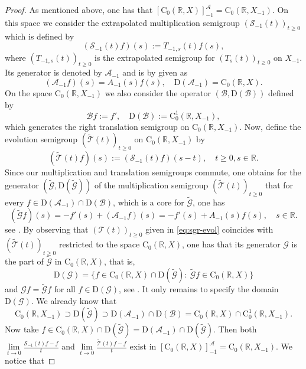 \documentclass[a4paper,oneside,10pt]{amsart}
\theoremstyle{definition}
\numberwithin{equation}{section}
\def\dom{\mathrm{D}}
\def\RR{\mathbb{R}}
\begin{document}
{
\begin{proof}
As mentioned above, one has that $\left[\mathrm{C}_0(\RR,X)\right]_{-1}^{\mathcal{A}}=\mathrm{C}_0(\RR,X_{-1})$. On this space we consider the extrapolated multiplication semigroup $(\mathcal{S}_{-1}(t))_{t\geq0}$ which is defined by
\[
(\mathcal{S}_{-1}(t)f)(s):=T_{-1,s}(t)f(s),
\]
where $(T_{-1,s}(t))_{t\geq0}$ is the extrapolated semigroup for  $(T_s(t))_{t\geq0}$  on  $X_{-1}$.
Its generator is  denoted by $\mathcal{A}_{-1}$ and is by  \cite[Lem.~4.6]{G1997} given as
\[\left(\mathcal{A}_{-1}f\right)(s)= A_{-1}(s)f(s),\quad \dom(\mathcal{A}_{-1}) = \mathrm{C}_0(\RR,X).\]
On the space $\mathrm{C}_0(\RR,X_{-1})$ we also consider the operator $(\mathcal{B},\dom(\mathcal{B}))$ defined by
\[
\mathcal{B}f:=f',\quad \dom(\mathcal{B}):=\mathrm{C}^1_0(\RR,X_{-1}),
\]
which  generates the right translation semigroup on $\mathrm{C}_0(\RR,X_{-1})$. Now, define the {evolution} semigroup $(\widetilde{\mathcal{T}}(t))_{t\geq0}$ on $\mathrm{C}_0(\RR,X_{-1})$ by
\[
(\widetilde{\mathcal{T}}(t)f)(s):={\left(\mathcal{S}_{-1}(t)f\right)}(s-t),\quad t\ge 0, s\in \RR.
\]
{Since our multiplication and translation semigroups commute,}
one obtains for the generator $(\widetilde{\mathcal{G}},\dom(\widetilde{\mathcal{G}}))$ {of the multiplication semigroup  $(\widetilde{\mathcal{T}}(t))_{t\geq0}$} that for every $f\in\dom(\mathcal{A}_{-1})\cap\dom(\mathcal{B})${, which is a core for $\widetilde{\mathcal{G}}$,} one has 
\[
(\widetilde{\mathcal{G}}f)(s)=-f'(s)+(\mathcal{A}_{-1}f)(s)=-f'(s)+A_{-1}(s)f(s),\quad s\in\RR.
\]
{see \cite[Sec.~II.2.7]{EN}. }
By observing that $(\mathcal{T}(t))_{t\geq0}$ given in \eqref{eq:sgr-evol} coincides with  $(\widetilde{\mathcal{T}}(t))_{t\geq0}$ {restricted to the space} $\mathrm{C}_0(\RR,X)$, one has that {its generator $\mathcal{G}$ is the part of $\widetilde{\mathcal{G}}$ in $\mathrm{C}_0(\RR,X)$, that is,}
\[
\dom(\mathcal{G})=\{f\in\mathrm{C}_0(\RR,X)\cap\dom(\widetilde{\mathcal{G}}):\ \widetilde{\mathcal{G}}f\in\mathrm{C}_0(\RR,X)\}
\]
and $\mathcal{G}f=\widetilde{\mathcal{G}}f$ for all $f\in\dom(\mathcal{G})$, see \cite[Sec.~II.2.3]{EN}. {It only remains to specify the domain $\dom(\mathcal{G})$. We already know that 
\[\mathrm{C}_0(\RR,X_{-1}) \supset  \dom(\widetilde{\mathcal{G}}) \supset \dom(\mathcal{A}_{-1})\cap\dom(\mathcal{B}) =  \mathrm{C}_0(\RR,X) \cap \mathrm{C}^1_0(\RR,X_{-1}).\]
Now take $f\in\mathrm{C}_0(\RR,X)\cap\dom(\widetilde{\mathcal{G}}) =  \dom(\mathcal{A}_{-1})\cap\dom(\widetilde{\mathcal{G}})$.} Then both $\lim\limits_{t\to0}{\frac{\mathcal{S}_{-1}(t)f-f}{t}}$ and $\lim\limits_{t\to0}{\frac{\widetilde{\mathcal{T}}(t)f-f}{t}}$ exist in $\left[\mathrm{C}_0(\RR,X)\right]_{-1}^{\mathcal{A}}=\mathrm{C}_0(\RR,X_{-1})$. We notice that

\end{proof}}
\end{document}

